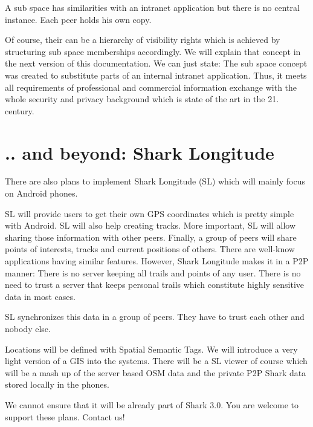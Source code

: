 A sub space has similarities with an intranet application but there is no central instance. Each peer holds his own copy.

Of course, their can be a hierarchy of visibility rights which is achieved by structuring sub space memberships accordingly. We will explain that concept in the next version of this documentation. We can just state: The sub space concept was created to substitute parts of an internal intranet application. Thus, it meets all requirements of professional and commercial information exchange with the whole security and privacy background which is state of the art in the 21. century.

\section{.. and beyond: Shark Longitude}
There are also plans to implement Shark Longitude (SL) which will mainly focus on Android phones.

SL will provide users to get their own GPS coordinates which is pretty simple with Android. SL will also help creating tracks. More important, SL will allow sharing those information with other peers. Finally, a group of peers will share points of interests, tracks and current positions of others. There are well-know
applications having similar features. However, Shark Longitude makes it in a P2P manner: There is no server keeping all trails and points of any user. There is no need to trust a server that keeps personal trails which constitute highly sensitive data in most cases.

SL synchronizes this data in a group of peers. They have to trust each other and nobody else.

Locations will be defined with Spatial Semantic Tags. We will introduce a very light version of a GIS into the systems. There will be a SL viewer of course which will be a mash up of the server based OSM data and the private P2P Shark data stored locally in the phones.

We cannot ensure that it will be already part of Shark 3.0. You are welcome to support these plans. Contact us!
